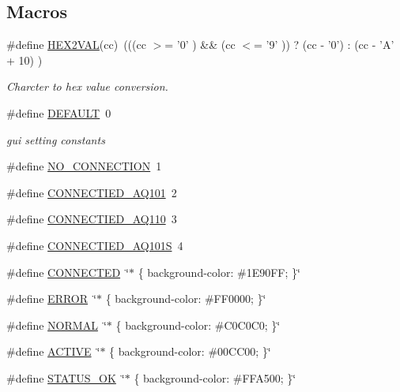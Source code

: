 \subsection*{Macros}
\begin{DoxyCompactItemize}
\item 
\#define \hyperlink{a00034_a428b04d2e2f2da2ea031a6c731660a71}{H\+E\+X2\+V\+A\+L}(cc)~(((cc $>$= '0' ) \&\& (cc $<$= '9' )) ? (cc -\/ '0') \+: (cc -\/ 'A' + 10) )
\begin{DoxyCompactList}\small\item\em Charcter to hex value conversion. \end{DoxyCompactList}\item 
\#define \hyperlink{a00034_a3da44afeba217135a680a7477b5e3ce3}{D\+E\+F\+A\+U\+L\+T}~0
\begin{DoxyCompactList}\small\item\em gui setting constants \end{DoxyCompactList}\item 
\#define \hyperlink{a00034_ae85d2d9036fe89b7201a98b2b3a091d2}{N\+O\+\_\+\+C\+O\+N\+N\+E\+C\+T\+I\+O\+N}~1
\item 
\#define \hyperlink{a00034_ad3f30e8f0d6d166c560d596099924b1e}{C\+O\+N\+N\+E\+C\+T\+I\+E\+D\+\_\+\+A\+Q101}~2
\item 
\#define \hyperlink{a00034_a356c6614536b72807f23fa6b062750f5}{C\+O\+N\+N\+E\+C\+T\+I\+E\+D\+\_\+\+A\+Q110}~3
\item 
\#define \hyperlink{a00034_ae5b15774e72547513ead1cbc9735b68d}{C\+O\+N\+N\+E\+C\+T\+I\+E\+D\+\_\+\+A\+Q101\+S}~4
\item 
\#define \hyperlink{a00034_af6202935c026af12978d46a765dafb90}{C\+O\+N\+N\+E\+C\+T\+E\+D}~\char`\"{}$\ast$ \{ background-\/color\+: \#1\+E90\+F\+F; \}\char`\"{}
\item 
\#define \hyperlink{a00034_a8fe83ac76edc595f6b98cd4a4127aed5}{E\+R\+R\+O\+R}~\char`\"{}$\ast$ \{ background-\/color\+: \#F\+F0000; \}\char`\"{}
\item 
\#define \hyperlink{a00034_a1291f416b069313021b519eea62d5bf1}{N\+O\+R\+M\+A\+L}~\char`\"{}$\ast$ \{ background-\/color\+: \#C0\+C0\+C0; \}\char`\"{}
\item 
\#define \hyperlink{a00034_a3a6d3cd70078e6046471ec528a09cd19}{A\+C\+T\+I\+V\+E}~\char`\"{}$\ast$ \{ background-\/color\+: \#00\+C\+C00; \}\char`\"{}
\item 
\#define \hyperlink{a00034_a2403320c41f08e7567cb169de5db66b3}{S\+T\+A\+T\+U\+S\+\_\+\+O\+K}~\char`\"{}$\ast$ \{ background-\/color\+: \#F\+F\+A500; \}\char`\"{}

\end{DoxyCompactItemize}
